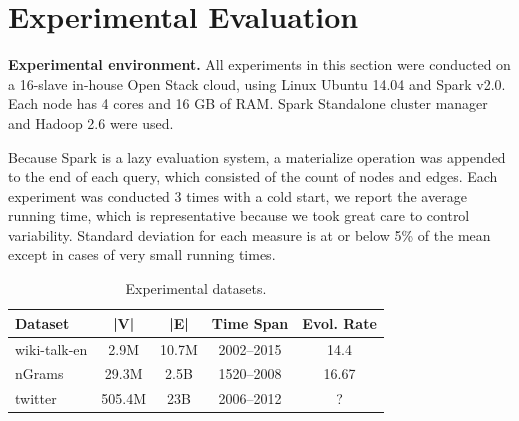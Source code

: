 \section{Experimental Evaluation}
\label{sec:exp}

{\bf Experimental environment.} All experiments in this section were
conducted on a 16-slave in-house Open Stack cloud, using Linux Ubuntu
14.04 and Spark v2.0.  Each node has 4 cores and 16 GB of RAM.  Spark
Standalone cluster manager and Hadoop 2.6 were used.

Because Spark is a lazy evaluation system, a materialize operation was
appended to the end of each query, which consisted of the count of
nodes and edges.  Each experiment was conducted 3 times with a cold
start, we report the average running time, which is representative
because we took great care to control variability.  Standard deviation
for each measure is at or below 5\% of the mean except in cases of
very small running times.

\begin{table}
\caption{Experimental datasets.}
\small
\begin{tabular}{l | c | c | c | c }
\hline
\multicolumn{1}{l|}{\bfseries Dataset} & \multicolumn{1}{c|}{\bfseries |V|} & \multicolumn{1}{c|}{\bfseries |E|} & \multicolumn{1}{c|}{\bfseries Time Span} & \multicolumn{1}{c}{\bfseries Evol. Rate} \\ \hline
wiki-talk-en & 2.9M & 10.7M & 2002--2015 & 14.4 \\ \hline
nGrams & 29.3M & 2.5B & 1520--2008 & 16.67 \\ \hline
twitter & 505.4M & 23B & 2006--2012 & ? \\ \hline
\end{tabular}
\label{tab:datasets}
\end{table}


